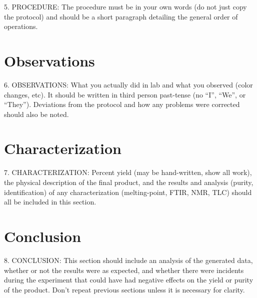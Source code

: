 \documentclass[letterpaper,amsmath,amssymb,prb,preprint,12pt]{revtex4-1}%
\begin{document}

5. PROCEDURE: The procedure must be in your own words (do not just copy the
protocol) and should be a short paragraph detailing the general order of operations.

\section{Observations}


6. OBSERVATIONS: What you actually did in lab and what you observed (color
changes, etc). It should be written in third person past-tense (no “I”, “We”, or
“They”). Deviations from the protocol and how any problems were corrected should
also be noted.

\section{Characterization}


7. CHARACTERIZATION: Percent yield (may be hand-written, show all work), the
physical description of the final product, and the results and analysis (purity,
identification) of any characterization (melting-point, FTIR, NMR, TLC) should all
be included in this section.

\section{Conclusion}


8. CONCLUSION: This section should include an analysis of the generated data,
whether or not the results were as expected, and whether there were incidents during
the experiment that could have had negative effects on the yield or purity of the
product. Don’t repeat previous sections unless it is necessary for clarity.


% 
% 
\end{document}
